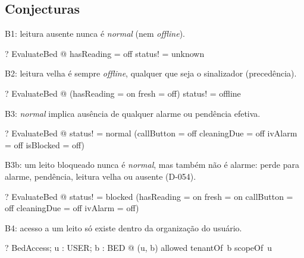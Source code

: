 \documentclass{article}
\begin{document}
\subsection*{Conjecturas}

B1: leitura ausente nunca é \emph{normal} (nem \emph{offline}).

\begin{zed}
  \vdash? \forall EvaluateBed @ hasReading = off \implies status! = unknown
\end{zed}

B2: leitura velha é sempre \emph{offline}, qualquer que seja o sinalizador (precedência).

\begin{zed}
  \vdash? \forall EvaluateBed @ (hasReading = on \land fresh = off) \implies status! = offline
\end{zed}

B3: \emph{normal} implica ausência de qualquer alarme ou pendência efetiva.

\begin{zed}
  \vdash? \forall EvaluateBed @ status! = normal \implies
    (callButton = off \land cleaningDue = off \land ivAlarm = off \land isBlocked = off)
\end{zed}

B3b: um leito bloqueado nunca é \emph{normal}, mas também não é alarme: perde para alarme, pendência,
leitura velha ou ausente (D-054).

\begin{zed}
  \vdash? \forall EvaluateBed @ status! = blocked \implies
    (hasReading = on \land fresh = on \land callButton = off \land cleaningDue = off \land ivAlarm = off)
\end{zed}

B4: acesso a um leito só existe dentro da organização do usuário.

\begin{zed}
  \vdash? \forall BedAccess; u : USER; b : BED @ (u, b) \in allowed \implies
    tenantOf~b \in scopeOf~u
\end{zed}
\end{document}
